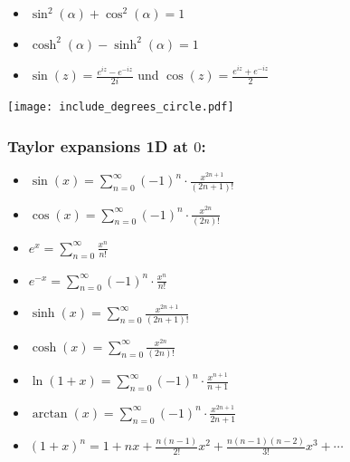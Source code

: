 \documentclass[a4paper,fontsize = 10pt]{article}
\def\sumn{\sum_{n=0}^\infty}
\begin{document}
\begin{itemize}
 \item $\sin^2(\alpha) + \cos^2(\alpha) = 1$
 \item $\cosh^2(\alpha) - \sinh^2(\alpha) = 1$
 \item $\sin(z) = \frac{e^{iz} - e^{-iz}}{2i}$ und $\cos(z) = \frac{e^{iz} + e^{-iz}}{2}$
\end{itemize}

\begingroup
\renewcommand*{\arraystretch}{2}


\begin{center}
  \texttt{[image: include\_degrees\_circle.pdf]}
  
\end{center}

\subsubsection*{Taylor expansions 1D at $0$:}
\begin{itemize}
 \item $\sin(x) = \sumn (-1)^n \cdot \frac{x^{2n+1}}{(2n+1)!}$
 \item $\cos(x) = \sumn (-1)^n \cdot \frac{x^{2n}}{(2n)!}$
 \item $e^x = \sumn \frac{x^n}{n!}$
 \item $e^{-x} = \sumn (-1)^n \cdot \frac{x^n}{n!}$
 \item $\sinh(x) = \sumn \frac{x^{2n+1}}{(2n+1)!}$
 \item $\cosh(x) = \sumn \frac{x^{2n}}{(2n)!}$
 \item $\ln(1+x) = \sumn  (-1)^n \cdot \frac{x^{n+1}}{n+1}$
 \item $\arctan(x) = \sumn (-1)^n \cdot \frac{x^{2n+1}}{2n+1}$
 \item $(1+x)^n = 1+nx+\frac{n(n-1)}{2!}x^2 + \frac{n(n-1)(n-2)}{3!}x^3 + \cdots$
\end{itemize}
\end{document}
